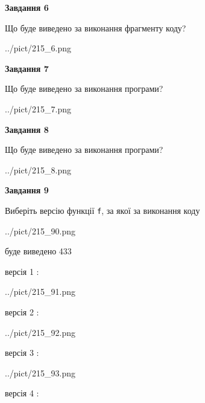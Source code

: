 \documentclass[12pt, ukrainian]{article}
\def\code#1{\Verb!#1!}
\begin{document}
{\begin {large}
{\begin {center}\textbf{Завдання 6}\end {center}}

Що буде виведено за виконання фрагменту коду?\par
\begin{center}
	{../pict/215_6.png}
\end{center}
\newpage

{\begin {center}\textbf{Завдання 7}\end {center}}

Що буде виведено за виконання програми?\par
\begin{center}
	{../pict/215_7.png}
\end{center}
\newpage

{\begin {center}\textbf{Завдання 8}\end {center}}

Що буде виведено за виконання програми?\par
\begin{center}
	{../pict/215_8.png}
\end{center}
\newpage

{\begin {center}\textbf{Завдання 9}\end {center}}

Виберіть версію функції \code{f}, за якої за виконання коду
\begin{center}
	{../pict/215_90.png}
\end{center}
буде виведено 433

\vspace{5mm}
версія 1 :

\begin{center}
	{../pict/215_91.png}
\end{center}
версія 2 :

\begin{center}
	{../pict/215_92.png}
\end{center}
версія 3 :

\begin{center}
	{../pict/215_93.png}
\end{center}
версія 4 :


\end{large}}
\end{document}
